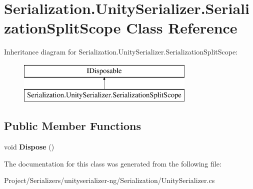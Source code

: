 \hypertarget{class_serialization_1_1_unity_serializer_1_1_serialization_split_scope}{}\section{Serialization.\+Unity\+Serializer.\+Serialization\+Split\+Scope Class Reference}
\label{class_serialization_1_1_unity_serializer_1_1_serialization_split_scope}
Inheritance diagram for Serialization.\+Unity\+Serializer.\+Serialization\+Split\+Scope\+:\begin{figure}[H]
\begin{center}
\leavevmode
\includegraphics[height=2.000000cm]{class_serialization_1_1_unity_serializer_1_1_serialization_split_scope}
\end{center}
\end{figure}
\subsection*{Public Member Functions}
\begin{DoxyCompactItemize}
\item 
\mbox{\label{class_serialization_1_1_unity_serializer_1_1_serialization_split_scope_ab009e8b5901075212d6f4b2cc830711e}} 
void {\bfseries Dispose} ()
\end{DoxyCompactItemize}


The documentation for this class was generated from the following file\+:\begin{DoxyCompactItemize}
\item 
Project/\+Serializers/unityserializer-\/ng/\+Serialization/Unity\+Serializer.\+cs\end{DoxyCompactItemize}
